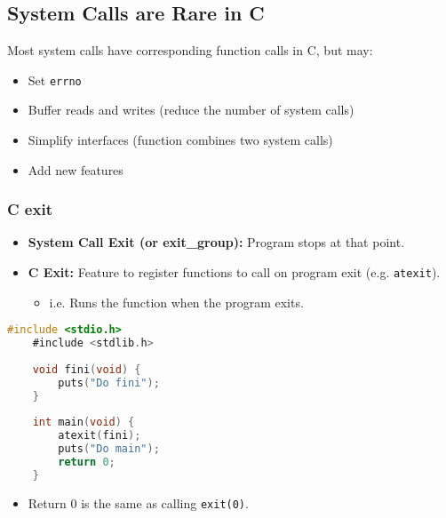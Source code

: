 \subsection{System Calls are Rare in C}
\begin{definition}
    Most system calls have corresponding function calls in C, but may:
    \begin{itemize}
        \item Set \texttt{errno}
        \item Buffer reads and writes (reduce the number of system calls)
        \item Simplify interfaces (function combines two system calls)
        \item Add new features
    \end{itemize}
\end{definition}

\subsubsection{C exit}
\begin{definition}
    \begin{itemize}
        \item \textbf{System Call Exit (or exit\_group):} Program stops at that point.
        \item \textbf{C Exit:} Feature to register functions to call on program exit (e.g. \texttt{atexit}).
        \begin{itemize}
            \item i.e. Runs the function when the program exits.
        \end{itemize}
    \end{itemize}
\end{definition}
\begin{example}
\begin{lstlisting}[language=C]
    #include <stdio.h>
    #include <stdlib.h>
    
    void fini(void) {
        puts("Do fini");
    }
    
    int main(void) {
        atexit(fini);
        puts("Do main");
        return 0;
    }
\end{lstlisting}
    \begin{itemize}
        \item Return 0 is the same as calling \texttt{exit(0)}.
    \end{itemize}
\end{example}

